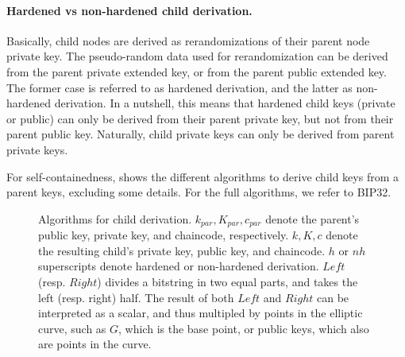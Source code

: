 \paragraph{Hardened vs non-hardened child derivation.} Basically, child nodes
are derived as rerandomizations of their parent node private key. The
pseudo-random data used for rerandomization can be derived from the parent
private extended key, or from the parent public extended key. The former case is
referred to as hardened derivation, and the latter as non-hardened derivation.
In a nutshell, this means that hardened child keys (private or public) can only
be derived from their parent private key, but not from their parent public key.
Naturally, child private keys can only be derived from parent private keys.

For self-containedness,  shows the different
algorithms to derive child keys from a parent keys, excluding some details. For
the full algorithms, we refer to BIP32.

\begin{figure}[ht!]
  \begin{minipage}[t]{0.55\textwidth}
  \end{minipage}
  \caption{Algorithms for child derivation. $k_{par},K_{par},c_{par}$ denote the
    parent's public key, private key, and chaincode, respectively. $k,K,c$
    denote the resulting child's private key, public key, and chaincode. $h$ or
    $nh$ superscripts denote hardened or non-hardened derivation. $Left$
    (resp. $Right$) divides a bitstring in two equal parts, and takes the left
    (resp. right) half. The result of both $Left$ and $Right$ can be interpreted
    as a scalar, and thus multipled by points in the elliptic curve, such as $G$,
    which is the base point, or public keys, which also are points in the
    curve.}
  \label{fig:childderivation}
\end{figure}

